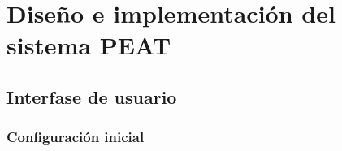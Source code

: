 \chapter{Diseño e implementación del sistema PEAT}
\section{Interfase de usuario}
\subsection{Configuración inicial}
